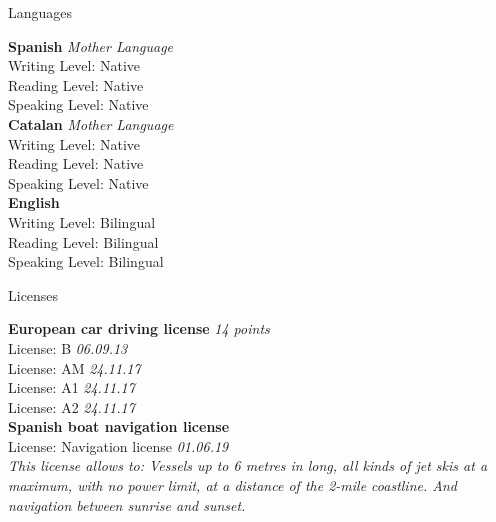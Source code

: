 \documentclass{resume} %
\begin{document}
\begin{rSection}{Languages}

{\bf Spanish} \hfill {\em Mother Language}\\ 
Writing Level: Native \\
Reading Level: Native \\
Speaking Level: Native \\

{\bf Catalan} \hfill {\em Mother Language}\\ 
Writing Level: Native \\
Reading Level: Native \\
Speaking Level: Native \\

{\bf English} \\ 
Writing Level: Bilingual \\
Reading Level: Bilingual \\
Speaking Level: Bilingual \\

\end{rSection}


\begin{rSection}{Licenses}

{\bf European car driving license} \hfill {\em 14 points}\\ 
License: B \hfill {\em 06.09.13} \\
License: AM \hfill {\em 24.11.17} \\
License: A1 \hfill {\em 24.11.17} \\
License: A2 \hfill {\em 24.11.17} \\

{\bf Spanish boat navigation license} \\ 
License: Navigation license \hfill {\em 01.06.19} \\
{\it This license allows to: Vessels up to 6 metres in long, all kinds of jet skis at a maximum, with no power limit, at a distance of the 2-mile coastline. And navigation between sunrise and sunset.}

\end{rSection}

\end{document}
